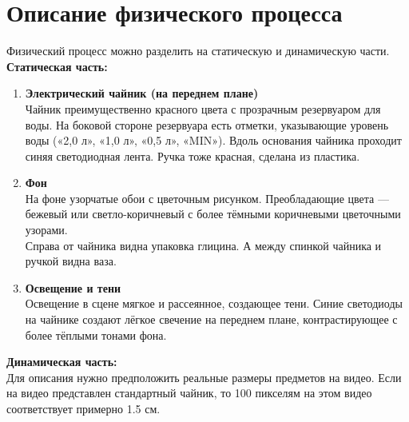 \documentclass[areasetadvanced]{scrartcl}
\begin{document}
\newpage
\section{Описание физического процесса}
Физический процесс можно разделить на статическую и динамическую части.\\

\textbf{Статическая часть:}
\begin{enumerate}
    \item \textbf{Электрический чайник (на переднем плане)}\\
    Чайник преимущественно красного цвета с прозрачным резервуаром для воды. На боковой стороне резервуара есть отметки, указывающие уровень воды («2,0 л», «1,0 л», «0,5 л», «MIN»). Вдоль основания чайника проходит синяя светодиодная лента. Ручка тоже красная, сделана из пластика.
    \item \textbf{Фон}\\
    На фоне узорчатые обои с цветочным рисунком. Преобладающие цвета — бежевый или светло-коричневый с более тёмными коричневыми цветочными узорами.\\
    Справа от чайника видна упаковка глицина. А между спинкой чайника и ручкой видна ваза.
    \item \textbf{Освещение и тени}\\
    Освещение в сцене мягкое и рассеянное, создающее тени. Синие светодиоды на чайнике создают лёгкое свечение на переднем плане, контрастирующее с более тёплыми тонами фона.
\end{enumerate}

\textbf{Динамическая часть:}\\
Для описания нужно предположить реальные размеры предметов на видео. Если на видео представлен стандартный чайник, то 100 пикселям на этом видео соответствует примерно 1.5 см.
\end{document}
